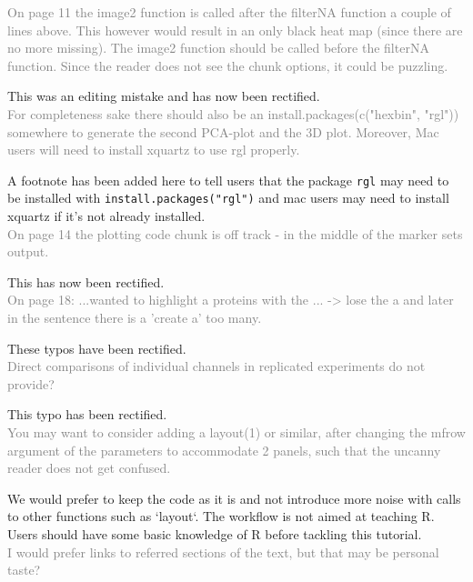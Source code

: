\documentclass[11pt]{article}
\begin{document}
\textcolor{gray} {On page 11 the image2 function is called after the filterNA function a couple of lines above. This however would result in an only black heat map (since there are no more missing). The image2 function should be called before the filterNA function. Since the reader does not see the chunk options, it could be puzzling.} 

This was an editing mistake and has now been rectified. \\
 
\textcolor{gray} {For completeness sake there should also be an install.packages(c("hexbin", "rgl")) somewhere to generate the second PCA-plot and the 3D plot. Moreover, Mac users will need to install xquartz to use rgl properly.} 


A footnote has been added here to tell users that the package \texttt{rgl} may need to be installed with \texttt{install.packages("rgl")} and mac users may need to install xquartz if it's not already installed. \\


\textcolor{gray} {On page 14 the plotting code chunk is off track - in the middle of the marker sets output.} 

This has now been rectified. \\
 

\textcolor{gray} {On page 18: ...wanted to highlight a proteins with the ... -> lose the a and later in the sentence there is a 'create a' too many.} 
 
These typos have been rectified. \\

\textcolor{gray} {Direct comparisons of individual channels in replicated experiments do not provide?} 
 
This typo has been rectified. \\

\textcolor{gray} {You may want to consider adding a layout(1) or similar, after changing the mfrow argument of the parameters to accommodate 2 panels, such that the uncanny reader does not get confused.} 

We would prefer to keep the code as it is and not introduce more noise with calls to other functions such as `layout`. The workflow is not aimed at teaching R. Users should have some basic knowledge of R before tackling this tutorial. \\

\textcolor{gray} {I would prefer links to referred sections of the text, but that may be personal taste?} 
\end{document}
